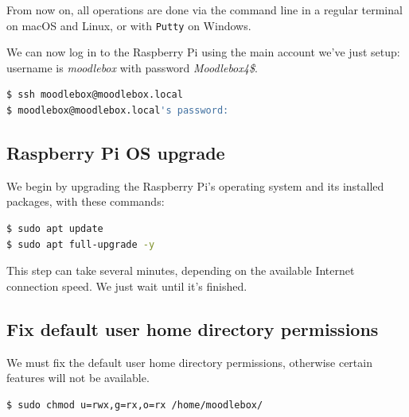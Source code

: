 \documentclass[12pt]{article}
\begin{document}
From now on, all operations are done via the command line in a regular terminal on macOS and Linux, or with \lstinline{Putty} on Windows.

We can now log in to the Raspberry Pi using the main account we've just setup: username is \emph{moodlebox} with password \emph{Moodlebox4\$}.

\begin{lstlisting}[language=bash]
$ ssh moodlebox@moodlebox.local
$ moodlebox@moodlebox.local's password:
\end{lstlisting}

\subsection{Raspberry Pi OS upgrade}

We begin by upgrading the Raspberry Pi's operating system and its installed packages, with these commands:
\begin{lstlisting}[language=bash]
$ sudo apt update
$ sudo apt full-upgrade -y
\end{lstlisting}

This step can take several minutes, depending on the available Internet connection speed.
We just wait until it's finished.

\subsection{Fix default user home directory permissions}

We must fix the default user home directory permissions, otherwise certain features will not be available.

\begin{lstlisting}[language=bash]
$ sudo chmod u=rwx,g=rx,o=rx /home/moodlebox/
\end{lstlisting}
\end{document}
